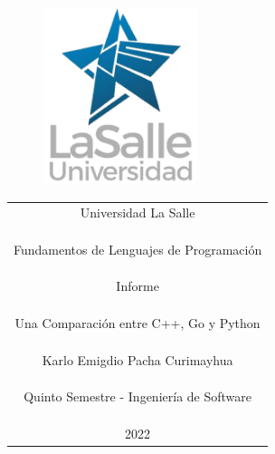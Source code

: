 \documentclass[https://www.overleaf.com/project/63761df255a8a9f4a15c3579
	letterpaper, %
	10pt, %
]{CSUniSchoolLabReport}
\begin{document}
\begin{figure}[H] %
	\centering %
	\includegraphics[width=0.4\textwidth]{Figures/logo.png} %
\end{figure}

\begin{center}
	\begin{tabular} {c}
        \Huge Universidad La Salle \\\\\\\\
		\huge Fundamentos de Lenguajes de Programación \\\\\\\\
		\LARGE Informe \\\\\\\\
        \huge Una Comparación entre C++, Go y Python \\\\\\\\
        \LARGE Karlo Emigdio Pacha Curimayhua \\\\\\\\
        \LARGE Quinto Semestre - Ingeniería de Software \\\\\\\\
		\LARGE 2022
	\end{tabular}
\end{center}

\begin{center}
	\begin{tabular}{l r}
	\end{tabular}
\end{center}
\end{document}
